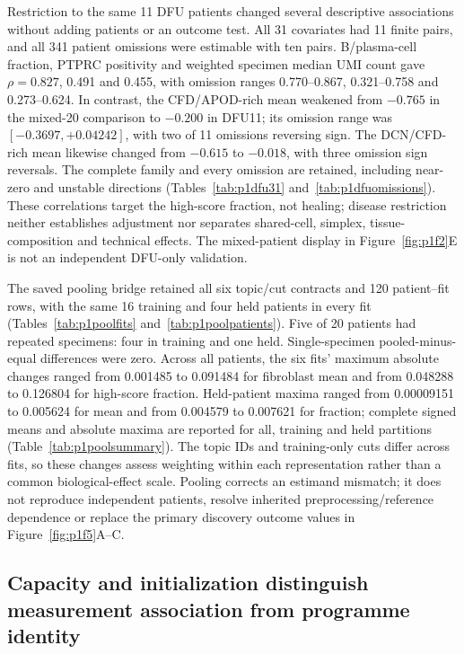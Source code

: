 Restriction to the same 11 DFU patients changed several descriptive associations without adding patients or an outcome test. All 31 covariates had 11 finite pairs, and all 341 patient omissions were estimable with ten pairs. B/plasma-cell fraction, PTPRC positivity and weighted specimen median UMI count gave $\rho=0.827$, 0.491 and 0.455, with omission ranges 0.770--0.867, 0.321--0.758 and 0.273--0.624. In contrast, the CFD/APOD-rich mean weakened from $-0.765$ in the mixed-20 comparison to $-0.200$ in DFU11; its omission range was $[-0.3697,+0.04242]$, with two of 11 omissions reversing sign. The DCN/CFD-rich mean likewise changed from $-0.615$ to $-0.018$, with three omission sign reversals. The complete family and every omission are retained, including near-zero and unstable directions (Tables~\ref{tab:p1dfu31} and~\ref{tab:p1dfuomissions}). These correlations target the high-score fraction, not healing; disease restriction neither establishes adjustment nor separates shared-cell, simplex, tissue-composition and technical effects. The mixed-patient display in Figure~\ref{fig:p1f2}E is not an independent DFU-only validation.

The saved pooling bridge retained all six topic/cut contracts and 120 patient--fit rows, with the same 16 training and four held patients in every fit (Tables~\ref{tab:p1poolfits} and~\ref{tab:p1poolpatients}). Five of 20 patients had repeated specimens: four in training and one held. Single-specimen pooled-minus-equal differences were zero. Across all patients, the six fits' maximum absolute changes ranged from 0.001485 to 0.091484 for fibroblast mean and from 0.048288 to 0.126804 for high-score fraction. Held-patient maxima ranged from 0.00009151 to 0.005624 for mean and from 0.004579 to 0.007621 for fraction; complete signed means and absolute maxima are reported for all, training and held partitions (Table~\ref{tab:p1poolsummary}). The topic IDs and training-only cuts differ across fits, so these changes assess weighting within each representation rather than a common biological-effect scale. Pooling corrects an estimand mismatch; it does not reproduce independent patients, resolve inherited preprocessing/reference dependence or replace the primary discovery outcome values in Figure~\ref{fig:p1f5}A--C.

\subsection{Capacity and initialization distinguish measurement association from programme identity}

